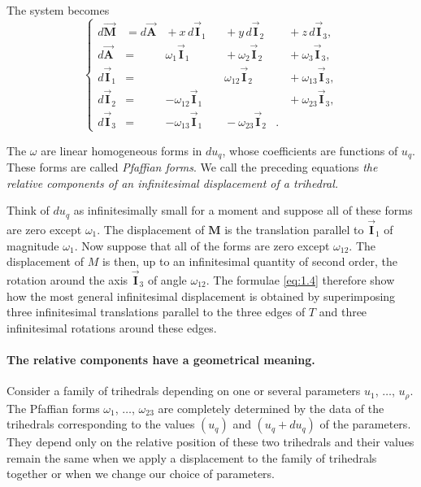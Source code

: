 \documentclass[leqno,11pt]{book}
\numberwithin{equation}{chapter}
\theoremstyle{shape1}
\theoremstyle{shapesmall}
\newcommand{\rvec}[1]{\vec{\mathbf{#1}}}
\newcommand{\ivec}{\rvec{I}}
\begin{document}
The system becomes
\begin{equation}
  \label{eq:1.4}
  \left\{
    \begin{alignedat}{6}
      d{\rvec{M}}&=d{\rvec{A}}&{}+x\,d\ivec_{1}&&{}+y\,d\ivec_{2}&&{}+z\,d\ivec_{3},\\
      d{\rvec{A}}&=&\omega_{1}\ivec_{1}&&{}+\omega_{2}\ivec_{2}&&{}+\omega_{3}\ivec_{3},\\
      d\ivec_{1}&=&&&{}\omega_{12}\ivec_{2}&&{}+\omega_{13}\ivec_{3},\\
      d\ivec_{2}&=&-\omega_{12}\ivec_{1}&&&&{}+\omega_{23}\ivec_{3},\\
      d\ivec_{3}&=&-\omega_{13}\ivec_{1}&&{}-\omega_{23}\ivec_{2}&.&
    \end{alignedat}
  \right.
\end{equation}

The $\omega$ are linear homogeneous forms in $du_{q}$, whose coefficients are functions of $u_{q}$. These forms are called \emph{Pfaffian forms}.  We call the preceding equations \emph{the relative components of an infinitesimal displacement of a trihedral.}

Think of $du_{q}$ as infinitesimally small for a moment and suppose all of these forms are zero except $\omega_{1}$. The displacement of $\textbf{M}$ is the translation parallel to $\ivec_{1}$ of magnitude $\omega_{1}$. Now suppose that all of the forms are zero except $\omega_{12}$. The displacement of $M$ is then, up to an infinitesimal quantity of second order, the rotation around the axis $\ivec_{3}$ of angle $\omega_{12}$. The formulae \eqref{eq:1.4} therefore show how the most general infinitesimal displacement is obtained by superimposing three infinitesimal translations parallel to the three edges of $T$ and three infinitesimal rotations around these edges.

\paragraph{The relative components have a geometrical meaning.}
\label{sec:4}
Consider a family of trihedrals depending on one or several parameters $u_{1}$, $\dots$, $u_{\rho}$. The Pfaffian forms $\omega_{1}$, $\dots$, $\omega_{23}$ are completely determined by the data of the trihedrals corresponding to the values $(u_{q})$ and $(u_{q}+du_{q})$ of the parameters. They depend only on the relative position of these two trihedrals and their values remain the same when we apply a displacement to the family of trihedrals together or when we change our choice of parameters.
\end{document}

